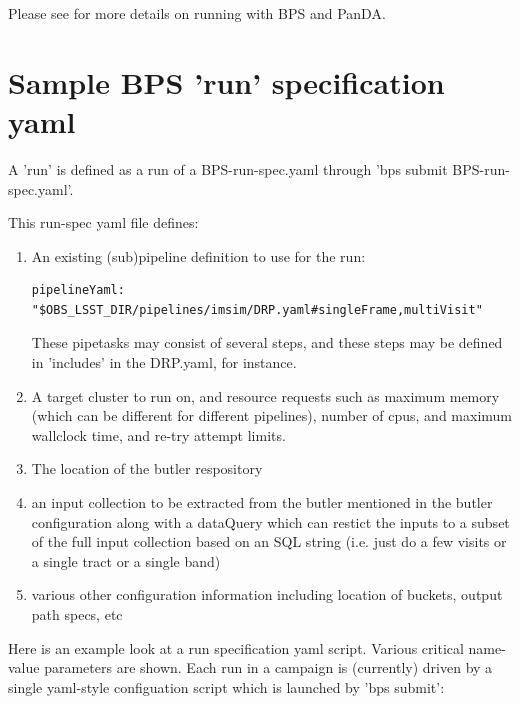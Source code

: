 \documentclass[DM,authoryear,toc]{lsstdoc}
\begin{document}
Please see \cite{DMTN-168} for more details on running with BPS and PanDA.

\section{Sample BPS 'run' specification yaml}

A 'run' is defined as a run of a BPS-run-spec.yaml through 'bps submit
BPS-run-spec.yaml'.

This run-spec yaml file defines:

\begin{enumerate}

\item An existing (sub)pipeline definition to use for the run:
\begin{verbatim}
pipelineYaml: 
"$OBS_LSST_DIR/pipelines/imsim/DRP.yaml#singleFrame,multiVisit"
\end{verbatim}
These pipetasks may consist of several steps, and these steps may be defined
in 'includes' in the DRP.yaml, for instance.

\item A target cluster to run on, and resource requests such as 
maximum memory (which can be different for different pipelines), number of cpus,
and maximum wallclock time, and re-try attempt limits.

\item The location of the butler respository

\item an input collection to be extracted from the butler mentioned in
the butler configuration along with a dataQuery which can restict the inputs
to a subset of the full input collection based on 
an SQL string (i.e. just do a few visits or a single tract
or a single band)

\item various other configuration information including location of 
buckets, output path specs, etc

\end{enumerate}

Here is an example look at a run specification yaml script. Various
critical name-value parameters are shown. Each run in a
campaign is (currently) driven by a single yaml-style 
configuation script which is launched by 'bps submit':
\end{document}
